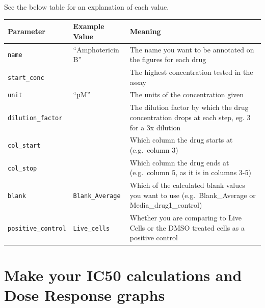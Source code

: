 \documentclass[
  letterpaper,
  DIV=11,
  numbers=noendperiod]{scrreprt}
\begin{document}
See the below table for an explanation of each value.

\begin{longtable}[]{@{}
  >{\raggedright\arraybackslash}p{}
  >{\raggedright\arraybackslash}p{}
  >{\raggedright\arraybackslash}p{}@{}}
\toprule\noalign{}
\begin{minipage}[b]{\linewidth}\raggedright
Parameter
\end{minipage} & \begin{minipage}[b]{\linewidth}\raggedright
Example Value
\end{minipage} & \begin{minipage}[b]{\linewidth}\raggedright
Meaning
\end{minipage} \\
\midrule\noalign{}
\endhead
\bottomrule\noalign{}
\endlastfoot
\texttt{name} & ``Amphotericin B'' & The name you want to be annotated
on the figures for each drug \\
\texttt{start\_conc} & 1.8 & The highest concentration tested in the
assay \\
\texttt{unit} & ``µM'' & The units of the concentration given \\
\texttt{dilution\_factor} & 3 & The dilution factor by which the drug
concentration drops at each step, eg. 3 for a 3x dilution \\
\texttt{col\_start} & 3 & Which column the drug starts at (e.g.~column
3) \\
\texttt{col\_stop} & 5 & Which column the drug ends at (e.g.~column 5,
as it is in columns 3-5) \\
\texttt{blank} & \texttt{Blank\_Average} & Which of the calculated blank
values you want to use (e.g.~Blank\_Average or Media\_drug1\_control) \\
\texttt{positive\_control} & \texttt{Live\_cells} & Whether you are
comparing to Live Cells or the DMSO treated cells as a positive
control \\
\end{longtable}


\chapter{Make your IC50 calculations and Dose Response
graphs}\label{make-your-ic50-calculations-and-dose-response-graphs}
\end{document}
